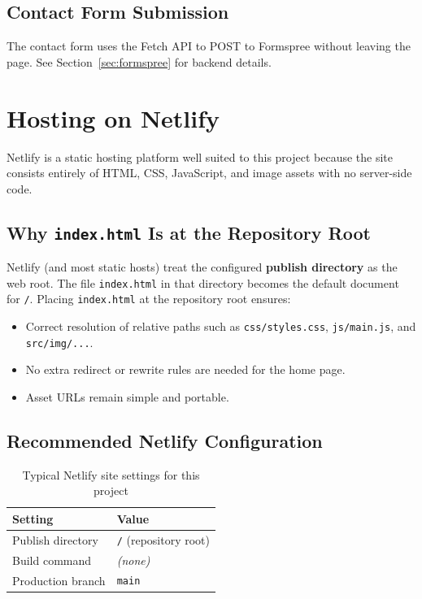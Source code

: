 \documentclass[11pt,a4paper]{article}
\begin{document}
\subsection{Contact Form Submission}

The contact form uses the Fetch API to POST to Formspree without leaving the
page. See Section~\ref{sec:formspree} for backend details.

\section{Hosting on Netlify}

Netlify is a static hosting platform well suited to this project because the
site consists entirely of HTML, CSS, JavaScript, and image assets with no
server-side code.

\subsection{Why \texttt{index.html} Is at the Repository Root}

Netlify (and most static hosts) treat the configured \textbf{publish directory}
as the web root. The file \texttt{index.html} in that directory becomes the
default document for \texttt{/}. Placing \texttt{index.html} at the repository
root ensures:

\begin{itemize}[noitemsep]
  \item Correct resolution of relative paths such as \texttt{css/styles.css},
        \texttt{js/main.js}, and \texttt{src/img/...}.
  \item No extra redirect or rewrite rules are needed for the home page.
  \item Asset URLs remain simple and portable.
\end{itemize}

\subsection{Recommended Netlify Configuration}

\begin{table}[h]
  \centering
  \begin{tabular}{@{}ll@{}}
    \toprule
    \textbf{Setting} & \textbf{Value} \\
    \midrule
    Publish directory & \texttt{/} (repository root) \\
    Build command     & \emph{(none)} \\
    Production branch & \texttt{main} \\
    \bottomrule
  \end{tabular}
  \caption{Typical Netlify site settings for this project}
\end{table}
\end{document}
